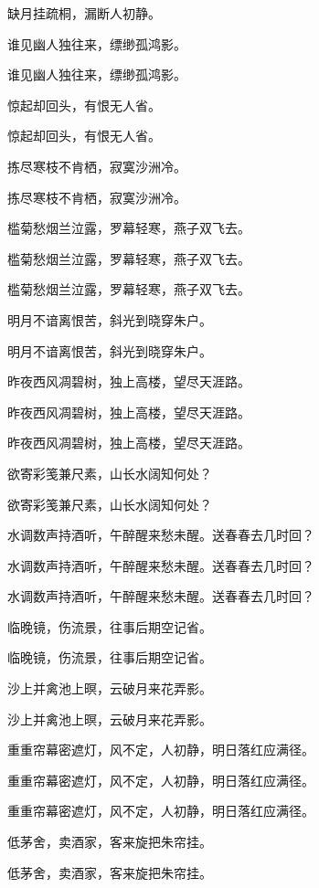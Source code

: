 \documentclass[12pt, a4paper, addpoints]{exam}
\begin{document}
\begin{questions}
\question[3] 缺月挂疏桐，漏断人初静。

\question[3] 谁见幽人独往来，缥缈孤鸿影。

\question[3] 谁见幽人独往来，缥缈孤鸿影。

\question[3] 惊起却回头，有恨无人省。

\question[3] 惊起却回头，有恨无人省。

\question[3] 拣尽寒枝不肯栖，寂寞沙洲冷。

\question[3] 拣尽寒枝不肯栖，寂寞沙洲冷。

\question[3] 槛菊愁烟兰泣露，罗幕轻寒，燕子双飞去。

\question[3] 槛菊愁烟兰泣露，罗幕轻寒，燕子双飞去。

\question[3] 槛菊愁烟兰泣露，罗幕轻寒，燕子双飞去。

\question[3] 明月不谙离恨苦，斜光到晓穿朱户。

\question[3] 明月不谙离恨苦，斜光到晓穿朱户。

\question[3] 昨夜西风凋碧树，独上高楼，望尽天涯路。

\question[3] 昨夜西风凋碧树，独上高楼，望尽天涯路。

\question[3] 昨夜西风凋碧树，独上高楼，望尽天涯路。

\question[3] 欲寄彩笺兼尺素，山长水阔知何处？

\question[3] 欲寄彩笺兼尺素，山长水阔知何处？

\question[3] 水调数声持酒听，午醉醒来愁未醒。送春春去几时回？

\question[3] 水调数声持酒听，午醉醒来愁未醒。送春春去几时回？

\question[3] 水调数声持酒听，午醉醒来愁未醒。送春春去几时回？

\question[3] 临晚镜，伤流景，往事后期空记省。

\question[3] 临晚镜，伤流景，往事后期空记省。

\question[3] 沙上并禽池上暝，云破月来花弄影。

\question[3] 沙上并禽池上暝，云破月来花弄影。

\question[3] 重重帘幕密遮灯，风不定，人初静，明日落红应满径。

\question[3] 重重帘幕密遮灯，风不定，人初静，明日落红应满径。

\question[3] 重重帘幕密遮灯，风不定，人初静，明日落红应满径。

\question[3] 低茅舍，卖酒家，客来旋把朱帘挂。

\question[3] 低茅舍，卖酒家，客来旋把朱帘挂。


\end{questions}
\end{document}
